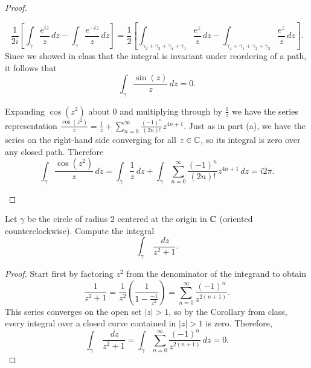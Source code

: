 \documentclass[10pt]{amsart}
\begin{document}
\begin{thm}
\begin{proof}
\begin{alphaenum}
      $$\frac{1}{2i}\left[ \int_\gamma \frac{e^{iz}}{z}\,dz - \int_{\gamma}\frac{e^{-iz}}{z}\,dz\right] = \frac{1}{2}\left[\int_{\gamma_2 + \gamma_3 + \gamma_4 + \gamma_1} \frac{e^{z}}{z}\,dz - \int_{\gamma_4 + \gamma_1 + \gamma_2 + \gamma_3}\frac{e^{z}}{z}\,dz\right].$$ 
      Since we showed in class that the integral is invariant under reordering of a path, it follows that $$\int_{\gamma}\frac{\sin(z)}{z}\,dz = 0.$$
    \item
      Expanding $\cos(z^2)$ about 0 and multiplying through by $\frac{1}{z}$ we have the series representation $\frac{\cos(z^2)}{z} = \frac{1}{z} + \sum_{n=0}^{\infty} \frac{(-1)^n}{(2n)!} z^{4n+1}$.
      Just as in part (a), we have the series on the right-hand side converging for all $z \in \mathbb{C}$, so its integral is zero over any closed path.  Therefore
      $$\int_{\gamma}\frac{\cos(z^2)}{z}\,dz = \int_{\gamma}\frac{1}{z}\,dz + \int_{\gamma}\sum_{n=0}^{\infty} \frac{(-1)^n}{(2n)!} z^{4n+1}\,dz = i2\pi.$$
    \end{alphaenum}
  \end{proof}
\end{thm}

\begin{thm}
  \label{Ex4}
  Let $\gamma$ be the circle of radius 2 centered at the origin in $\mathbb{C}$
  (oriented counterclockwise).  
  Compute the integral 
  $$
  {\int_\gamma}\; \dfrac{\,dz}{z^2 + 1}.
  $$
\end{thm}

\begin{proof}
  Start first by factoring $z^2$ from the denominator of the integrand to obtain $$\frac{1}{z^2+1} = \frac{1}{z^2}\left(\frac{1}{1-{\frac{-1}{z^2}}}\right) = \sum_{n=0}^{\infty}\frac{(-1)^n}{z^{2(n+1)}}.$$
  This series converges on the open set $|z| > 1$, so by the Corollary from class, every integral over a closed curve contained in $|z| > 1$ is zero.  Therefore, $${\int_\gamma}\; \dfrac{\,dz}{z^2 + 1} = \int_\gamma \sum_{n=0}^{\infty}\frac{(-1)^n}{z^{2(n+1)}}\,dz = 0.$$
\end{proof}
\end{document}
